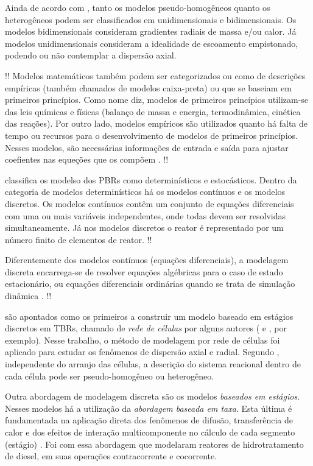 Ainda de acordo com , tanto os modelos pseudo-homogêneos
quanto os heterogêneos podem ser classificados em unidimensionais e
bidimensionais. Os modelos bidimensionais consideram gradientes radiais de massa
e/ou calor. Já modelos unidimensionais consideram a idealidade de escoamento
empistonado, podendo ou não contemplar a dispersão axial.

!! Modelos matemáticos também podem ser categorizados ou como de
descrições empíricas (também chamados de modelos caixa-preta) ou que se baseiam
em primeiros princípios. Como nome diz, modelos de primeiros princípios
utilizam-se das leis químicas e físicas (balanço de massa e energia,
termodinâmica, cinética das reações). Por outro lado, modelos empíricos são
utilizados quanto há falta de tempo ou recursos para o desenvolvimento de
modelos de primeiros princípios. Nesses modelos, são necessárias informações de
entrada e saída para ajustar coefientes nas equeções que os compõem
\cite{Edgar2001}. !!

\cite{Lamb1963} classifica os modelso dos PBRs como determinísticos e
estocásticos. Dentro da categoria de modelos determinísticos há os modelos
contínuos e os modelos discretos. Os modelos contínuos contêm um conjunto de
equações diferenciais com uma ou mais variáveis independentes, onde todas devem
ser resolvidas simultaneamente. Já nos modelos discretos o reator é representado
por um número finito de elementos de reator. !!

Diferentemente dos modelos contínuos (equações diferenciais), a modelagem
discreta encarrega-se de resolver equações algébricas para o caso de estado
estacionário, ou equações diferenciais ordinárias quando se trata de simulação
dinâmica \cite{Schnitzlein1987}. !!

 são apontados como os primeiros a construir um modelo
baseado em estágios discretos em TBRs, chamado de \emph{rede de células} por
alguns autores ( e , por
exemplo). Nesse trabalho, o método de modelagem por rede de células foi aplicado
para estudar os fenômenos de dispersão axial e radial. Segundo
, independente do arranjo das células, a descrição
do sistema reacional dentro de cada célula pode ser pseudo-homogêneo ou
heterogêneo.

Outra abordagem de modelagem discreta são os modelos \emph{baseados em
estágios}. Nesses modelos há a utilização da \emph{abordagem baseada em taxa}.
Esta última é fundamentada na aplicação direta dos fenômenos de difusão,
transferência de calor e dos efeitos de interação multicomponente no cálculo de
cada segmento (estágio) \cite{Jakobsson2004}. Foi com essa abordagem que
 modelaram reatores de hidrotratamento de diesel, em
suas operações contracorrente e cocorrente.


